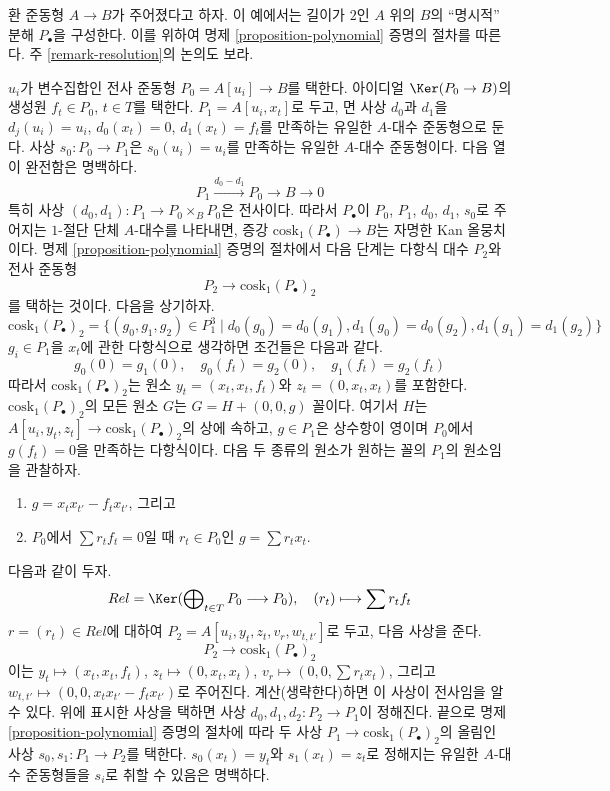 \begin{example}
\label{example-resolution-length-two}
환 준동형 $A\to B$가 주어졌다고 하자. 이 예에서는 길이가 $2$인 $A$
위의 $B$의 ``명시적'' 분해 $P_\bullet$을 구성한다. 이를 위하여 명제
\ref{proposition-polynomial} 증명의 절차를 따른다. 주
\ref{remark-resolution}의 논의도 보라.

\medskip\noindent
$u_i$가 변수집합인 전사 준동형 $P_0=A[u_i]\to B$를 택한다. 아이디얼
$\Ker(P_0\to B)$의 생성원 $f_t\in P_0$, $t\in T$를 택한다.
$P_1=A[u_i,x_t]$로 두고, 면 사상 $d_0$과 $d_1$을
$d_j(u_i)=u_i$, $d_0(x_t)=0$, $d_1(x_t)=f_t$를 만족하는 유일한
$A$-대수 준동형으로 둔다. 사상 $s_0:P_0\to P_1$은
$s_0(u_i)=u_i$를 만족하는 유일한 $A$-대수 준동형이다. 다음 열이
완전함은 명백하다.
$$
P_1 \xrightarrow{d_0 - d_1} P_0 \to B \to 0
$$
특히 사상 $(d_0,d_1):P_1\to P_0\times_BP_0$은 전사이다. 따라서
$P_\bullet$이 $P_0$, $P_1$, $d_0$, $d_1$, $s_0$로 주어지는 $1$-절단
단체 $A$-대수를 나타내면, 증강 $\text{cosk}_1(P_\bullet)\to B$는
자명한 Kan 올뭉치이다. 명제 \ref{proposition-polynomial} 증명의 절차에서
다음 단계는 다항식 대수 $P_2$와 전사 준동형
$$
P_2 \longrightarrow \text{cosk}_1(P_\bullet)_2
$$
를 택하는 것이다. 다음을 상기하자.
$$
\text{cosk}_1(P_\bullet)_2 =
\{(g_0, g_1, g_2) \in P_1^3 \mid d_0(g_0) = d_0(g_1),
d_1(g_0) = d_0(g_2), d_1(g_1) = d_1(g_2)\}
$$
$g_i\in P_1$을 $x_t$에 관한 다항식으로 생각하면 조건들은 다음과 같다.
$$
g_0(0) = g_1(0),\quad
g_0(f_t) = g_2(0),\quad
g_1(f_t) = g_2(f_t)
$$
따라서 $\text{cosk}_1(P_\bullet)_2$는 원소
$y_t=(x_t,x_t,f_t)$와 $z_t=(0,x_t,x_t)$를 포함한다.
$\text{cosk}_1(P_\bullet)_2$의 모든 원소 $G$는
$G=H+(0,0,g)$ 꼴이다. 여기서 $H$는
$A[u_i,y_t,z_t]\to\text{cosk}_1(P_\bullet)_2$의 상에 속하고,
$g\in P_1$은 상수항이 영이며 $P_0$에서 $g(f_t)=0$을 만족하는
다항식이다. 다음 두 종류의 원소가 원하는 꼴의 $P_1$의 원소임을 관찰하자.
\begin{enumerate}
\item $g=x_tx_{t'}-f_tx_{t'}$, 그리고
\item $P_0$에서 $\sum r_tf_t=0$일 때 $r_t\in P_0$인
$g=\sum r_tx_t$.
\end{enumerate}
다음과 같이 두자.
$$
Rel = \Ker(\bigoplus\nolimits_{t \in T} P_0 \longrightarrow P_0),\quad
(r_t) \longmapsto \sum r_tf_t
$$
$r=(r_t)\in Rel$에 대하여
$P_2=A[u_i,y_t,z_t,v_r,w_{t,t'}]$로 두고, 다음 사상을 준다.
$$
P_2 \longrightarrow \text{cosk}_1(P_\bullet)_2
$$
이는 $y_t\mapsto(x_t,x_t,f_t)$,
$z_t\mapsto(0,x_t,x_t)$,
$v_r\mapsto(0,0,\sum r_tx_t)$, 그리고
$w_{t,t'}\mapsto(0,0,x_tx_{t'}-f_tx_{t'})$로 주어진다. 계산(생략한다)하면
이 사상이 전사임을 알 수 있다. 위에 표시한 사상을 택하면 사상
$d_0,d_1,d_2:P_2\to P_1$이 정해진다. 끝으로 명제
\ref{proposition-polynomial} 증명의 절차에 따라 두 사상
$P_1\to\text{cosk}_1(P_\bullet)_2$의 올림인 사상
$s_0,s_1:P_1\to P_2$를 택한다. $s_0(x_t)=y_t$와
$s_1(x_t)=z_t$로 정해지는 유일한 $A$-대수 준동형들을 $s_i$로 취할 수
있음은 명백하다.
\end{example}








